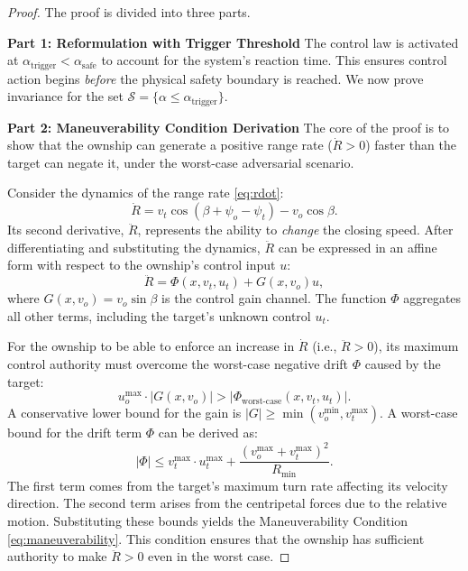 \documentclass[10pt]{article}
\begin{document}
\begin{proof}
    The proof is divided into three parts.

    \textbf{Part 1: Reformulation with Trigger Threshold}
    The control law is activated at $\alpha_{\text{trigger}} < \alpha_{\text{safe}}$ to account for the system's reaction time. This ensures control action begins \textit{before} the physical safety boundary is reached. We now prove invariance for the set $\mathcal{S} = \{ \alpha \leq \alpha_{\text{trigger}} \}$.

    \textbf{Part 2: Maneuverability Condition Derivation}
    The core of the proof is to show that the ownship can generate a positive range rate ($\dot{R} > 0$) faster than the target can negate it, under the worst-case adversarial scenario.

    Consider the dynamics of the range rate \eqref{eq:rdot}:
    \[
    \dot{R} = v_t \cos(\beta + \psi_o - \psi_t) - v_o \cos \beta.
    \]
    Its second derivative, $\ddot{R}$, represents the ability to \textit{change} the closing speed. After differentiating and substituting the dynamics, $\ddot{R}$ can be expressed in an affine form with respect to the ownship's control input $u$:
    \[
    \ddot{R} = \Phi(x, v_t, u_t) + G(x, v_o) u,
    \]
    where $G(x, v_o) = v_o \sin \beta$ is the control gain channel. The function $\Phi$ aggregates all other terms, including the target's unknown control $u_t$.

    For the ownship to be able to enforce an increase in $\dot{R}$ (i.e., $\ddot{R} > 0$), its maximum control authority must overcome the worst-case negative drift $\Phi$ caused by the target:
    \[
    u_o^{\max} \cdot |G(x, v_o)| > |\Phi_{\text{worst-case}}(x, v_t, u_t)|.
    \]
    A conservative lower bound for the gain is $|G| \geq \min(v_o^{\min}, v_t^{\max})$. A worst-case bound for the drift term $\Phi$ can be derived as:
    \[
    |\Phi| \leq v_t^{\max} \cdot u_t^{\max} + \frac{(v_o^{\max} + v_t^{\max})^2}{R_{\text{min}}}.
    \]
    The first term comes from the target's maximum turn rate affecting its velocity direction. The second term arises from the centripetal forces due to the relative motion. Substituting these bounds yields the Maneuverability Condition \eqref{eq:maneuverability}. This condition ensures that the ownship has sufficient authority to make $\ddot{R} > 0$ even in the worst case.


\end{proof}
\end{document}
